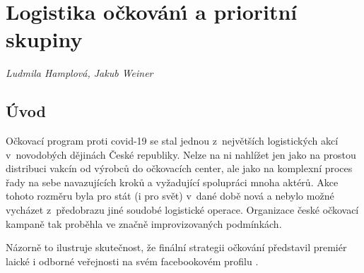 
\chapter{Logistika o\v{c}kov\'{a}n\'{\i} a prioritní skupiny} \label{Logistika_ockovani}

\textit{Ludmila Hamplová, Jakub Weiner}
\vspace{15mm}


\section*{Úvod} %
Očkovací program proti covid-19 se stal jednou z~největších logistických akcí v~novodobých dějinách České republiky. Nelze na ni nahlížet jen jako na prostou distribuci vakcín od výrobců do očkovacích center, ale jako na komplexní proces řady na sebe navazujících kroků a vyžadující spolupráci mnoha aktérů. Akce tohoto rozměru byla pro stát (i pro svět) v~dané době nová a nebylo možné vycházet z~předobrazu jiné soudobé logistické operace. Organizace české očkovací kampaně tak proběhla ve značně improvizovaných podmínkách. %


    
Názorně to ilustruje skutečnost, že finální strategii očkování představil premiér laické i odborné veřejnosti na svém facebookovém profilu \cite{logoc_caulidi}. 



